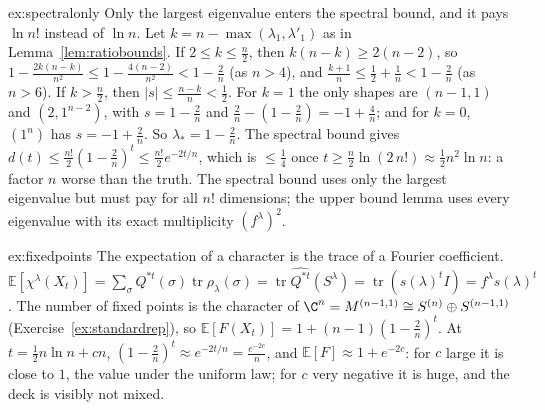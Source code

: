 \begin{solution}{ex:spectralonly}
\idea Only the largest eigenvalue enters the spectral bound, and it pays $\ln n!$ instead of $\ln n$.
\writeup Let $k=n-\max(\lambda_1,\lambda'_1)$ as in Lemma~\ref{lem:ratiobounds}. If $2\le k\le\frac n2$, then $k(n-k)\ge2(n-2)$, so $1-\frac{2k(n-k)}{n^2}\le1-\frac{4(n-2)}{n^2}<1-\frac2n$ (as $n>4$), and $\frac{k+1}n\le\frac12+\frac1n<1-\frac2n$ (as $n>6$). If $k>\frac n2$, then $|s|\le\frac{n-k}n<\frac12$. For $k=1$ the only shapes are $(n-1,1)$ and $(2,1^{n-2})$, with $s=1-\frac2n$ and
$\frac2n-(1-\frac2n)=-1+\frac4n$; and for $k=0$, $(1^n)$ has $s=-1+\frac2n$. So $\lambda_*=1-\frac2n$. The spectral bound gives $d(t)\le\frac{n!}2(1-\frac2n)^t\le\frac{n!}2e^{-2t/n}$, which is $\le\frac14$ once $t\ge\frac n2\ln(2\,n!)\approx\frac12n^2\ln n$: a factor $n$ worse than the truth.
The spectral bound uses only the largest eigenvalue but must pay for all $n!$ dimensions; the upper bound lemma uses every eigenvalue with its exact multiplicity $(f^\lambda)^2$.
\end{solution}

\begin{solution}{ex:fixedpoints}
\idea The expectation of a character is the trace of a Fourier coefficient.
\writeup $\mathbb E[\chi^\lambda(X_t)]=\sum_\sigma Q^{*t}(\sigma)\operatorname{tr}\rho_\lambda(\sigma)=\operatorname{tr}\widehat{Q^{*t}}(S^\lambda)=\operatorname{tr}(s(\lambda)^tI)=f^\lambda s(\lambda)^t$. The number of fixed points is the character of $\C^n=M^{(n-1,1)}\cong S^{(n)}\oplus S^{(n-1,1)}$ (Exercise~\ref{ex:standardrep}), so
$\mathbb E[F(X_t)]=1+(n-1)(1-\frac2n)^t$. At $t=\frac12n\ln n+cn$, $(1-\frac2n)^t\approx e^{-2t/n}=\frac{e^{-2c}}n$, and $\mathbb E[F]\approx1+e^{-2c}$: for $c$ large it is close to $1$, the value under the uniform law; for $c$ very negative it is huge, and the deck is visibly not mixed.
\end{solution}


